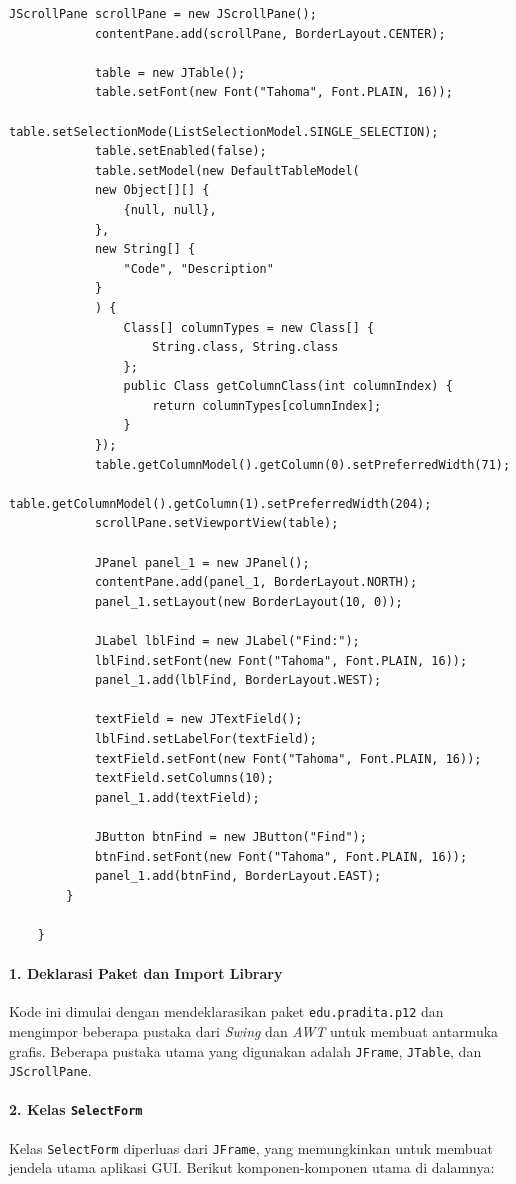 \begin{lstlisting}[style=JavaStyle]
			JScrollPane scrollPane = new JScrollPane();
			contentPane.add(scrollPane, BorderLayout.CENTER);
			
			table = new JTable();
			table.setFont(new Font("Tahoma", Font.PLAIN, 16));
			table.setSelectionMode(ListSelectionModel.SINGLE_SELECTION);
			table.setEnabled(false);
			table.setModel(new DefaultTableModel(
			new Object[][] {
				{null, null},
			},
			new String[] {
				"Code", "Description"
			}
			) {
				Class[] columnTypes = new Class[] {
					String.class, String.class
				};
				public Class getColumnClass(int columnIndex) {
					return columnTypes[columnIndex];
				}
			});
			table.getColumnModel().getColumn(0).setPreferredWidth(71);
			table.getColumnModel().getColumn(1).setPreferredWidth(204);
			scrollPane.setViewportView(table);
			
			JPanel panel_1 = new JPanel();
			contentPane.add(panel_1, BorderLayout.NORTH);
			panel_1.setLayout(new BorderLayout(10, 0));
			
			JLabel lblFind = new JLabel("Find:");
			lblFind.setFont(new Font("Tahoma", Font.PLAIN, 16));
			panel_1.add(lblFind, BorderLayout.WEST);
			
			textField = new JTextField();
			lblFind.setLabelFor(textField);
			textField.setFont(new Font("Tahoma", Font.PLAIN, 16));
			textField.setColumns(10);
			panel_1.add(textField);
			
			JButton btnFind = new JButton("Find");
			btnFind.setFont(new Font("Tahoma", Font.PLAIN, 16));
			panel_1.add(btnFind, BorderLayout.EAST);
		}
		
	}
\end{lstlisting}


\paragraph{1. Deklarasi Paket dan Import Library}
Kode ini dimulai dengan mendeklarasikan paket \texttt{edu.pradita.p12} dan mengimpor beberapa pustaka dari \textit{Swing} dan \textit{AWT} untuk membuat antarmuka grafis. Beberapa pustaka utama yang digunakan adalah \texttt{JFrame}, \texttt{JTable}, dan \texttt{JScrollPane}.

\paragraph{2. Kelas \texttt{SelectForm}}
Kelas \texttt{SelectForm} diperluas dari \texttt{JFrame}, yang memungkinkan untuk membuat jendela utama aplikasi GUI. Berikut komponen-komponen utama di dalamnya:

